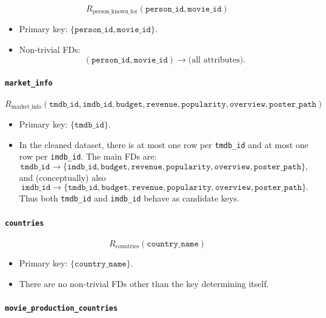 \documentclass{article}
\begin{document}
\[
R_{\text{person\_known\_for}}( \texttt{person\_id}, \texttt{movie\_id} )
\]

\begin{itemize}
    \item Primary key: $\{\texttt{person\_id}, \texttt{movie\_id}\}$.
    \item Non-trivial FDs:
    \[
    (\texttt{person\_id}, \texttt{movie\_id}) \rightarrow \text{(all attributes)}.
    \]
\end{itemize}

\paragraph{\texttt{market\_info}}

\[
R_{\text{market\_info}}( \texttt{tmdb\_id}, \texttt{imdb\_id}, \texttt{budget}, \texttt{revenue}, \texttt{popularity}, \texttt{overview}, \texttt{poster\_path} )
\]

\begin{itemize}
    \item Primary key: $\{\texttt{tmdb\_id}\}$.
    \item In the cleaned dataset, there is at most one row per \texttt{tmdb\_id} and at most one row per \texttt{imdb\_id}. The main FDs are:
    \[
    \texttt{tmdb\_id} \rightarrow \{\texttt{imdb\_id}, \texttt{budget}, \texttt{revenue}, \texttt{popularity}, \texttt{overview}, \texttt{poster\_path}\},
    \]
    and (conceptually) also
    \[
    \texttt{imdb\_id} \rightarrow \{\texttt{tmdb\_id}, \texttt{budget}, \texttt{revenue}, \texttt{popularity}, \texttt{overview}, \texttt{poster\_path}\}.
    \]
    Thus both \texttt{tmdb\_id} and \texttt{imdb\_id} behave as candidate keys.
\end{itemize}

\paragraph{\texttt{countries}}

\[
R_{\text{countries}}( \texttt{country\_name} )
\]

\begin{itemize}
    \item Primary key: $\{\texttt{country\_name}\}$.
    \item There are no non-trivial FDs other than the key determining itself.
\end{itemize}

\paragraph{\texttt{movie\_production\_countries}}
\end{document}
